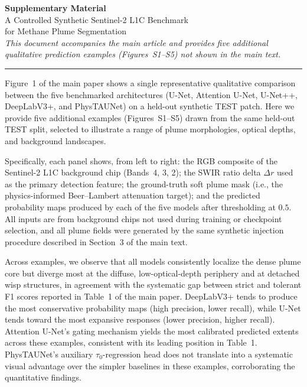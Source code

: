 \documentclass[10pt,letterpaper]{article}
\begin{document}
\begin{center}
  {\Large\bfseries Supplementary Material}\\[0.6em]
  {\large A Controlled Synthetic Sentinel-2 L1C Benchmark\\
         for Methane Plume Segmentation}\\[1.0em]
  {\normalsize
   \textit{This document accompanies the main article and provides
   five additional qualitative prediction examples (Figures~S1--S5)
   not shown in the main text.}}
\end{center}

\vspace{0.5em}
\noindent\rule{\linewidth}{0.6pt}
\vspace{0.5em}

\noindent
Figure~1 of the main paper shows a single representative qualitative
comparison between the five benchmarked architectures
(U-Net, Attention U-Net, U-Net++, DeepLabV3+, and PhysTAUNet) on a
held-out synthetic TEST patch.  Here we provide five additional
examples (Figures~S1--S5) drawn from the same held-out TEST split,
selected to illustrate a range of plume morphologies, optical depths,
and background landscapes.

Specifically, each panel shows, from left to right: the RGB composite
of the Sentinel-2 L1C background chip (Bands~4, 3, 2); the SWIR ratio
delta $\Delta r$ used as the primary detection feature; the
ground-truth soft plume mask (i.e., the physics-informed Beer--Lambert
attenuation target); and the predicted probability maps produced by
each of the five models after thresholding at $0.5$.  All inputs are
from background chips not used during training or checkpoint selection,
and all plume fields were generated by the same synthetic injection
procedure described in Section~3 of the main text.

Across examples, we observe that all models consistently localize the
dense plume core but diverge most at the diffuse, low-optical-depth
periphery and at detached wisp structures, in agreement with the
systematic gap between strict and tolerant F1 scores reported in
Table~1 of the main paper.  DeepLabV3+ tends to produce the most
conservative probability maps (high precision, lower recall), while
U-Net tends toward the most expansive responses (lower precision,
higher recall).  Attention U-Net's gating mechanism yields the most
calibrated predicted extents across these examples, consistent with
its leading position in Table~1.  PhysTAUNet's auxiliary
$\tau_0$-regression head does not translate into a systematic visual
advantage over the simpler baselines in these examples, corroborating
the quantitative findings.
\end{document}
